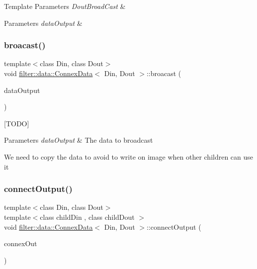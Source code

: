 \begin{DoxyTemplParams}{Template Parameters}
{\em Dout\+Broad\+Cast} & \\
\hline
\end{DoxyTemplParams}

\begin{DoxyParams}{Parameters}
{\em data\+Output} & \\
\hline
\end{DoxyParams}
\mbox{\label{classfilter_1_1data_1_1_connex_data_a16e8347560f6e429a410f21c0b9bd48d}} 
\subsubsection{\texorpdfstring{broacast()}{broacast()}\hspace{0.1cm}{\footnotesize\ttfamily [2/2]}}
{\footnotesize\ttfamily template$<$class Din, class Dout$>$ \\
void \hyperlink{classfilter_1_1data_1_1_connex_data}{filter\+::data\+::\+Connex\+Data}$<$ Din, Dout $>$\+::broacast (\begin{DoxyParamCaption}\item[{Dout \&}]{data\+Output }\end{DoxyParamCaption})\hspace{0.3cm}{\ttfamily [inline]}}

\mbox{[}T\+O\+DO\mbox{]} 
\begin{DoxyParams}{Parameters}
{\em data\+Output} & The data to broadcast \\
\hline
\end{DoxyParams}
We need to copy the data to avoid to write on image when other children can use it\mbox{\label{classfilter_1_1data_1_1_connex_data_a93772066f126cab918b46b285c63073a}} 
\subsubsection{\texorpdfstring{connect\+Output()}{connectOutput()}}
{\footnotesize\ttfamily template$<$class Din, class Dout$>$ \\
template$<$class child\+Din , class child\+Dout $>$ \\
void \hyperlink{classfilter_1_1data_1_1_connex_data}{filter\+::data\+::\+Connex\+Data}$<$ Din, Dout $>$\+::connect\+Output (\begin{DoxyParamCaption}\item[{\hyperlink{classfilter_1_1data_1_1_connex_data}{Connex\+Data}$<$ child\+Din, child\+Dout $>$ \&}]{connex\+Out }\end{DoxyParamCaption})\hspace{0.3cm}{\ttfamily [inline]}}


